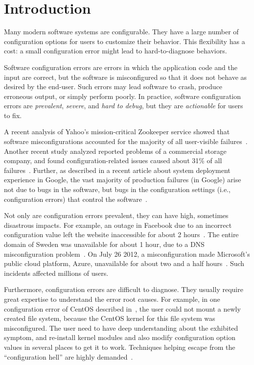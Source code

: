 \section{Introduction}
\label{sec:introduction}

Many modern software systems are configurable. They
have a large number of configuration options for users
to customize their behavior. This flexibility has a cost:
a small configuration error might lead to hard-to-diagnose
behaviors.

Software configuration errors are errors in which
the application code and the input are correct, but the software is
misconfigured so that it does not behave
as desired by the end-user. Such errors may lead software to crash,
produce erroneous output, or simply perform poorly.
In practice, software configuration
errors are \textit{prevalent}, \textit{severe}, and
\textit{hard to debug}, but they are \textit{actionable} for users to fix.


A recent analysis of Yahoo's mission-critical Zookeeper service
showed that software misconfigurations accounted for
the majority of all user-visible failures~\cite{bft}. Another
recent study analyzed reported problems of a commercial
storage company, and found configuration-related issues
caused about 31\% of all failures~\cite{Yin:2011:ESC}.
Further, as described in a recent article about system deployment experience
in Google, the vast majority of production failures (in Google)
arise not due to bugs in the software, but bugs in the
configuration settings (i.e., configuration errors)
that control the software~\cite{googleconf}.

Not only are configuration errors prevalent, they
can have high, sometimes disastrous impacts. For example,
an outage in Facebook due to
an incorrect configuration value left the website 
inaccessible for about 2 hours~\cite{fbout}. 
The entire  domain of Sweden was unavailable
for about 1 hour, due to a DNS misconfiguration problem~\cite{sedown}.
On July 26 2012, 
a misconfiguration made 
Microsoft's public cloud platform, Azure,
unavailable for about two and a half hours~\cite{msdown}.
Such incidents affected millions of users.

Furthermore, configuration errors are difficult to diagnose. 
They usually require great expertise to understand
the error root causes. For example, in one
configuration error of CentOS described in~\cite{Yin:2011:ESC},
the user could not mount a newly created file system,
because the CentOS kernel for this file system was
misconfigured. The user need to have deep understanding about the
exhibited symptom,  and re-install kernel modules and
also modify configuration option values in
several places to get it to work.
Techniques helping escape from the ``configuration hell''
are highly demanded~\cite{googleconf}.

